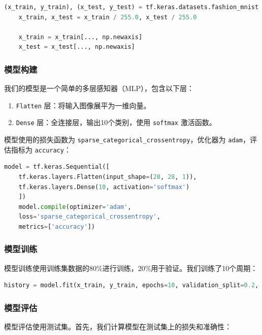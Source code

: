 \documentclass[a4paper,12pt]{article}
\begin{document}
\begin{lstlisting}[language=Python]
	(x_train, y_train), (x_test, y_test) = tf.keras.datasets.fashion_mnist.load_data()
	x_train, x_test = x_train / 255.0, x_test / 255.0  
	
	x_train = x_train[..., np.newaxis]
	x_test = x_test[..., np.newaxis]
\end{lstlisting}

\subsubsection{模型构建}

我们的模型是一个简单的多层感知器（MLP），包含以下层：

\begin{enumerate}
	\item \texttt{Flatten} 层：将输入图像展平为一维向量。
	\item \texttt{Dense} 层：全连接层，输出10个类别，使用 \texttt{softmax} 激活函数。
\end{enumerate}

模型使用的损失函数为 \texttt{sparse\_categorical\_crossentropy}，优化器为 \texttt{adam}，评估指标为 \texttt{accuracy}：

\begin{lstlisting}[language=Python]
	model = tf.keras.Sequential([
	tf.keras.layers.Flatten(input_shape=(28, 28, 1)),
	tf.keras.layers.Dense(10, activation='softmax')
	])
	model.compile(optimizer='adam',
	loss='sparse_categorical_crossentropy',
	metrics=['accuracy'])
\end{lstlisting}

\subsubsection{模型训练}

模型训练使用训练集数据的80\%进行训练，20\%用于验证。我们训练了10个周期：

\begin{lstlisting}[language=Python]
	history = model.fit(x_train, y_train, epochs=10, validation_split=0.2, verbose=2)
\end{lstlisting}

\subsubsection{模型评估}

模型评估使用测试集。首先，我们计算模型在测试集上的损失和准确性：
\end{document}
